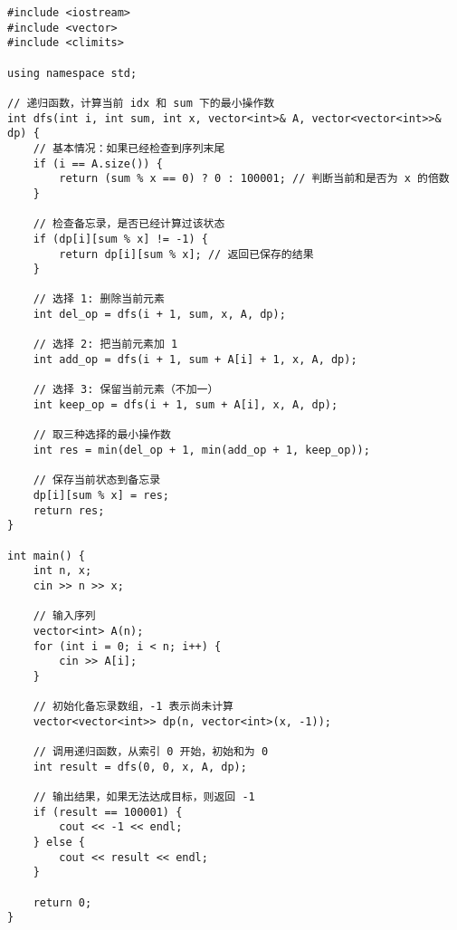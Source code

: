 \documentclass[a4paper]{ctexart}
\begin{document}
\begin{lstlisting}
#include <iostream>
#include <vector>
#include <climits>

using namespace std;

// 递归函数，计算当前 idx 和 sum 下的最小操作数
int dfs(int i, int sum, int x, vector<int>& A, vector<vector<int>>& dp) {
	// 基本情况：如果已经检查到序列末尾
	if (i == A.size()) {
		return (sum % x == 0) ? 0 : 100001; // 判断当前和是否为 x 的倍数
	}
	
	// 检查备忘录，是否已经计算过该状态
	if (dp[i][sum % x] != -1) {
		return dp[i][sum % x]; // 返回已保存的结果
	}
	
	// 选择 1: 删除当前元素
	int del_op = dfs(i + 1, sum, x, A, dp);
	
	// 选择 2: 把当前元素加 1
	int add_op = dfs(i + 1, sum + A[i] + 1, x, A, dp);
	
	// 选择 3: 保留当前元素（不加一）
	int keep_op = dfs(i + 1, sum + A[i], x, A, dp);
	
	// 取三种选择的最小操作数
	int res = min(del_op + 1, min(add_op + 1, keep_op));
	
	// 保存当前状态到备忘录
	dp[i][sum % x] = res;
	return res;
}

int main() {
	int n, x;
	cin >> n >> x;
	
	// 输入序列
	vector<int> A(n);
	for (int i = 0; i < n; i++) {
		cin >> A[i];
	}
	
	// 初始化备忘录数组，-1 表示尚未计算
	vector<vector<int>> dp(n, vector<int>(x, -1));
	
	// 调用递归函数，从索引 0 开始，初始和为 0
	int result = dfs(0, 0, x, A, dp);
	
	// 输出结果，如果无法达成目标，则返回 -1
	if (result == 100001) {
		cout << -1 << endl;
	} else {
		cout << result << endl;
	}
	
	return 0;
}
\end{lstlisting}
	
	
\end{document}

